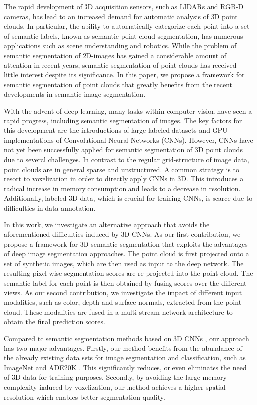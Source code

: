 \documentclass[runningheads,a4paper]{llncs}
\begin{document}
The rapid development of 3D acquisition sensors, such as LIDARs and RGB-D cameras, has lead to an increased demand for automatic analysis of 3D point clouds. In particular, the ability to automatically categorize each point into a set of semantic labels, known as semantic point cloud segmentation, has numerous applications such as scene understanding and robotics. While the problem of semantic segmentation of 2D-images has gained a considerable amount of attention in recent years, semantic segmentation of point clouds has received little interest despite its significance. In this paper, we propose a framework for semantic segmentation of point clouds that greatly benefits from the recent developments in semantic image segmentation. 

With the advent of deep learning, many tasks within computer vision have seen a rapid progress, including semantic segmentation of images. The key factors for this development are the introductions of large labeled datasets \cite{imagenet_cvpr09} and GPU implementations of Convolutional Neural Networks (CNNs). However, CNNs have not yet been successfully applied for semantic segmentation of 3D point clouds due to several challenges. In contrast to the regular grid-structure of image data, point clouds are in general sparse and unstructured. A common strategy is to resort to voxelization in order to directly apply CNNs in 3D. This introduces a radical increase in memory consumption and leads to a decrease in resolution. Additionally, labeled 3D data, which is crucial for training CNNs, is scarce due to difficulties in data annotation.

In this work, we investigate an alternative approach that avoids the aforementioned difficulties induced by 3D CNNs. As our first contribution, we propose a framework for 3D semantic segmentation that exploits the advantages of deep image segmentation approaches. The point cloud is first projected onto a set of synthetic images, which are then used as input to the deep network. The resulting pixel-wise segmentation scores are re-projected into the point cloud. The semantic label for each point is then obtained by fusing scores over the different views. As our second contribution, we investigate the impact of different input modalities, such as color, depth and surface normals, extracted from the point cloud. These modalities are fused in a multi-stream network architecture to obtain the final prediction scores. 

Compared to semantic segmentation methods based on 3D CNNs \cite{maturana2015voxnet}, our approach has two major advantages. Firstly, our method benefits from the abundance of the already existing data sets for image segmentation and classification, such as ImageNet \cite{imagenet_cvpr09} and ADE20K \cite{zhou2017scene}. This significantly reduces, or even eliminates the need of 3D data for training purposes. Secondly, by avoiding the large memory complexity induced by voxelization, our method achieves a higher spatial resolution which enables better segmentation quality. 
\end{document}
